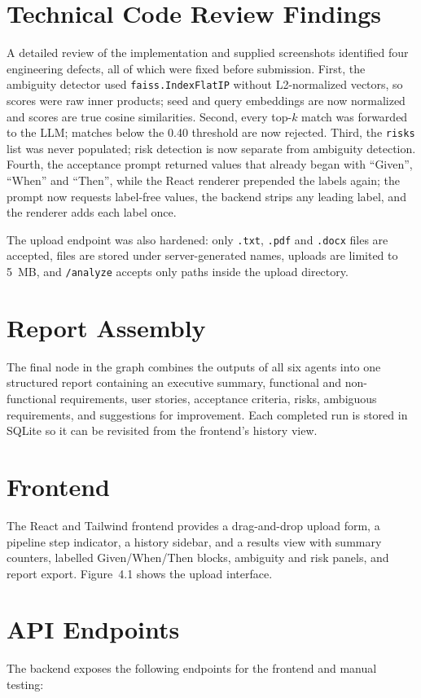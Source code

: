 \documentclass[12pt,a4paper,openany]{report}
\begin{document}
\section{Technical Code Review Findings}\label{sec:review}
A detailed review of the implementation and supplied screenshots
identified four engineering defects, all of which were fixed before
submission. First, the ambiguity detector used \texttt{faiss.IndexFlatIP}
without L2-normalized vectors, so scores were raw inner products; seed and
query embeddings are now normalized and scores are true cosine
similarities. Second, every top-$k$ match was forwarded to the LLM; matches
below the 0.40 threshold are now rejected. Third, the \texttt{risks} list
was never populated; risk detection is now separate from ambiguity
detection. Fourth, the acceptance prompt returned values that already
began with ``Given'', ``When'' and ``Then'', while the React renderer
prepended the labels again; the prompt now requests label-free values, the
backend strips any leading label, and the renderer adds each label once.

The upload endpoint was also hardened: only \texttt{.txt}, \texttt{.pdf}
and \texttt{.docx} files are accepted, files are stored under
server-generated names, uploads are limited to 5~MB, and \texttt{/analyze}
accepts only paths inside the upload directory.

\section{Report Assembly}
The final node in the graph combines the outputs of all six agents into
one structured report containing an executive summary, functional and
non-functional requirements, user stories, acceptance criteria, risks,
ambiguous requirements, and suggestions for improvement. Each completed
run is stored in SQLite so it can be revisited from the frontend's history
view.

\section{Frontend}
The React and Tailwind frontend provides a drag-and-drop upload form, a
pipeline step indicator, a history sidebar, and a results view with summary
counters, labelled Given/When/Then blocks, ambiguity and risk panels, and
report export. Figure~4.1 shows the upload interface.

\section{API Endpoints}
The backend exposes the following endpoints for the frontend and manual
testing:
\end{document}
